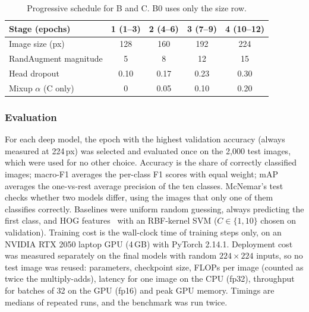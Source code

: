 \documentclass{COMPXXXX}
\begin{document}
\begin{table}[t]
\centering\footnotesize
\caption{Progressive schedule for B and C. B0 uses only the size row.}
\label{tab:sched}
\begin{tabular}{@{}lcccc@{}}
\toprule
Stage (epochs) & 1 (1--3) & 2 (4--6) & 3 (7--9) & 4 (10--12) \\
\midrule
Image size (px) & 128 & 160 & 192 & 224 \\
RandAugment magnitude & 5 & 8 & 12 & 15 \\
Head dropout & 0.10 & 0.17 & 0.23 & 0.30 \\
Mixup $\alpha$ (C only) & 0 & 0.05 & 0.10 & 0.20 \\
\bottomrule
\end{tabular}
\end{table}

\subsubsection{Evaluation}
For each deep model, the epoch with the highest validation accuracy (always measured at 224\,px) was
selected and evaluated once on the 2{,}000 test images, which were used for no other choice. Accuracy is
the share of correctly classified images; macro-F1 averages the per-class F1 scores with equal weight;
mAP averages the one-vs-rest average precision of the ten classes. McNemar's
test~\cite{mcnemar1947note} checks whether two models differ, using the images that only one of them
classifies correctly. Baselines were uniform random guessing, always predicting the first class, and
HOG features~\cite{dalal2005histograms} with an RBF-kernel SVM ($C\in\{1,10\}$ chosen on validation).
Training cost is the wall-clock time of training steps only, on an NVIDIA RTX 2050 laptop GPU (4\,GB)
with PyTorch 2.14.1. Deployment cost was measured separately on the final models with random
$224{\times}224$ inputs, so no test image was reused: parameters, checkpoint size, FLOPs per image
(counted as twice the multiply-adds), latency for one image on the CPU (fp32), throughput for
batches of 32 on the GPU (fp16) and peak GPU memory. Timings are medians of repeated runs, and the
benchmark was run twice.
\end{document}
